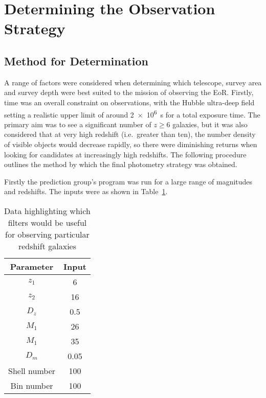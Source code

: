 
\newpage
\section{Determining the Observation Strategy} %
\label{sec:method_for_strategy_choosing}
	\subsection{Method for Determination} %
	\label{sub:method_for_determination}
		A range of factors were considered when determining which telescope, survey area and survey depth were best suited to the mission of observing the EoR. Firstly, time was an overall constraint on observations, with the Hubble ultra-deep field setting a realistic upper limit of around \SI{2e6}{\second} for a total exposure time. The primary aim was to see a significant number of $z\ge6$ galaxies, but it was also considered that at very high redshift (i.e.\ greater than ten), the number density of visible objects would decrease rapidly, so there were diminishing returns when looking for candidates at increasingly high redshifts. The following procedure outlines the method by which the final photometry strategy was obtained.

		Firstly the prediction group's program was run for a large range of magnitudes and redshifts. The inputs were as shown in Table~\ref{tab:program_inputs}.
		\begin{table}[htbp]
			\begin{center}
				\begin{tabular}{c|c}
					Parameter 	& Input \\
					\hline \hline
					$z_1$ & 6 \\
					$z_2$ & 16 \\
					$D_z$ & 0.5 \\
					$M_1$ & 26 \\
					$M_1$ & 35 \\
					$D_m$ & 0.05 \\
					Shell number & 100 \\
					Bin number & 100
				\end{tabular}
			\end{center}
			\caption{Data highlighting which filters would be useful for observing particular redshift galaxies\cite{Galactic_Astronomy_Binney_Merrifield}\label{tab:program_inputs}}
		\end{table}

